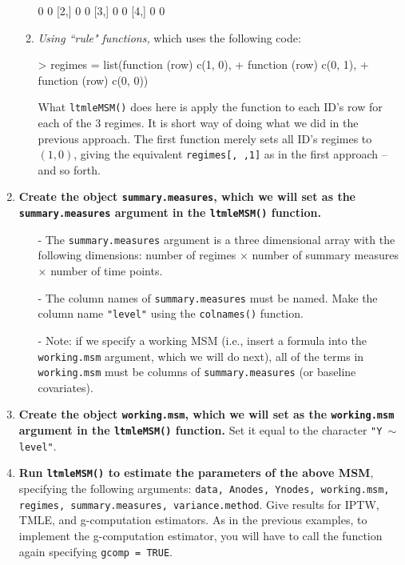 \documentclass[answers]{exam}
\begin{document}
\begin{enumerate}
\begin{enumerate}
\begin{Schunk}
\begin{Soutput}
     [,1] [,2]
[1,]    0    0
[2,]    0    0
[3,]    0    0
[4,]    0    0
\end{Soutput}
\end{Schunk}
\item \textit{Using ``rule" functions,} which uses the following code: 
\begin{Schunk}
\begin{Sinput}
> regimes = list(function (row) c(1, 0),
+                function (row) c(0, 1),
+                function (row) c(0, 0))
\end{Sinput}
\end{Schunk}
What \texttt{ltmleMSM()} does here is apply the function to each ID's row for each of the 3 regimes. It is short way of doing what we did in the previous approach. The first function merely sets all ID's regimes to $(1,0)$, giving the equivalent \texttt{regimes[, ,1]} as in the first approach -- and so forth.
\end{enumerate}
\item \textbf{Create the object \texttt{summary.measures}, which we will set as the \texttt{summary.measures} argument in the \texttt{ltmleMSM()} function.} 
\begin{itemize}
\item[-] The \texttt{summary.measures} argument is a three dimensional array with the following dimensions: number of regimes $\times$ number of summary measures $\times$ number of time points. 
\item[-] The column names of \texttt{summary.measures} must be named. Make the column name \texttt{"level"} using the \texttt{colnames()} function.
\item[-] Note: if we specify a working MSM (i.e., insert a formula into the \texttt{working.msm} argument, which we will do next), all of the terms in \texttt{working.msm} must be columns of \texttt{summary.measures} (or baseline covariates). 
\end{itemize}
\item \textbf{Create the object \texttt{working.msm}, which we will set as the \texttt{working.msm} argument in the \texttt{ltmleMSM()} function.} Set it equal to the character \texttt{"Y $\sim$ level"}.
\item \textbf{Run \texttt{ltmleMSM()} to estimate the parameters of the above MSM}, specifying the following arguments: \texttt{data, Anodes, Ynodes, working.msm, regimes, summary.measures, variance.method}. Give results for IPTW, TMLE, and g-computation estimators. As in the previous examples, to implement the g-computation estimator, you will have to call the function again specifying \texttt{gcomp = TRUE}.
\end{enumerate}
\end{document}
